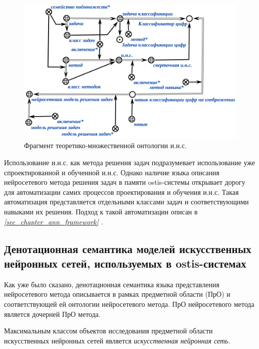 \begin{figure}[H]
	\centering
	\includegraphics[scale=0.5]{author/part3/figures/actions_concepts.png}
	\caption{Фрагмент теоретико-множественной онтологии и.н.с.}
	\label{fig:actions_concepts}
\end{figure}

Использование и.н.с. как метода решения задач подразумевает использование уже спроектированной и обученной и.н.с. Однако наличие языка описания нейросетевого метода решения задач в памяти ostis-системы открывает дорогу для автоматизации самих процессов проектирования и обучения и.н.с. Такая автоматизация представляется отдельными классами задач и соответствующими навыками их решения. Подход к такой автоматизации описан в \textit{\ref{sec_chapter_ann_framework} }.

\subsection{Денотационная семантика моделей искусственных нейронных сетей, используемых в ostis-системах}

Как уже было сказано, денотационная семантика языка представления нейросетевого метода описывается в рамках предметной области (ПрО) и соответствующей ей онтологии нейросетевого метода. ПрО нейросетевого метода является дочерней ПрО метода.

Максимальным классом объектов исследования предметной области искусственных нейронных сетей является \textit{искусственная нейронная сеть}.

\begin{SCn}
\end{SCn}

